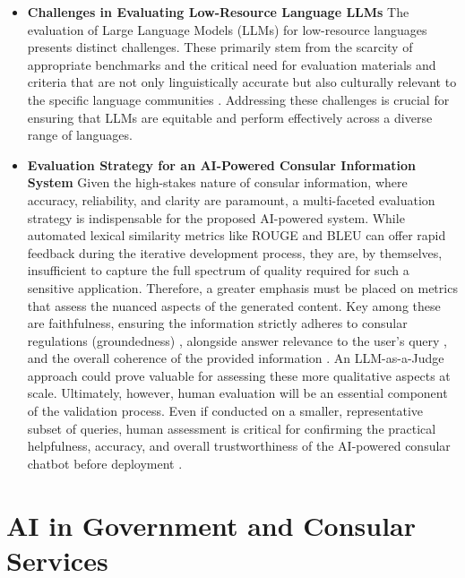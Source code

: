 \documentclass[12pt]{report}
\begin{document}
\begin{itemize}
  \item \textbf{Challenges in Evaluating Low-Resource Language LLMs}
  The evaluation of Large Language Models (LLMs) for low-resource languages presents distinct challenges. These primarily stem from the scarcity of appropriate benchmarks and the critical need for evaluation materials and criteria that are not only linguistically accurate but also culturally relevant to the specific language communities \cite{Chang2023Survey}. Addressing these challenges is crucial for ensuring that LLMs are equitable and perform effectively across a diverse range of languages.

\item \textbf{Evaluation Strategy for an AI-Powered Consular Information System}
  Given the high-stakes nature of consular information, where accuracy, reliability, and clarity are paramount, a multi-faceted evaluation strategy is indispensable for the proposed AI-powered system. While automated lexical similarity metrics like ROUGE \cite{Lin2004ROUGE} and BLEU \cite{Papineni2002BLEU} can offer rapid feedback during the iterative development process, they are, by themselves, insufficient to capture the full spectrum of quality required for such a sensitive application. Therefore, a greater emphasis must be placed on metrics that assess the nuanced aspects of the generated content. Key among these are faithfulness, ensuring the information strictly adheres to consular regulations (groundedness) \cite{Thulke2025FaithfulRAG}, alongside answer relevance to the user's query \cite{Upadhyay2024RelevanceComparison}, and the overall coherence of the provided information \cite{Li2023LLMEval}. An LLM-as-a-Judge approach \cite{Zheng2023JudgingLLM} could prove valuable for assessing these more qualitative aspects at scale. Ultimately, however, human evaluation will be an essential component of the validation process. Even if conducted on a smaller, representative subset of queries, human assessment is critical for confirming the practical helpfulness, accuracy, and overall trustworthiness of the AI-powered consular chatbot before deployment \cite{Chang2023Survey}.


\end{itemize}

\section{AI in Government and Consular Services}
\end{document}

